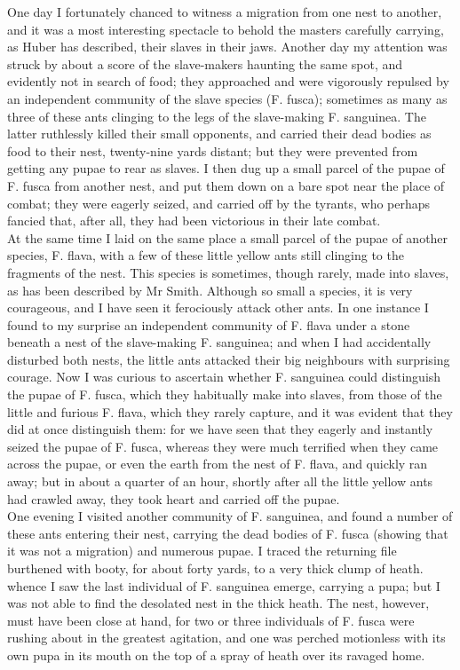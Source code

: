 \indent One day I fortunately chanced to witness a migration from one nest to another, and it was a most interesting spectacle to behold the masters carefully carrying, as Huber has described, their slaves in their jaws. Another day my attention was struck by about a score of the slave-makers haunting the same spot, and evidently not in search of food; they approached and were vigorously repulsed by an independent community of the slave species (F. fusca); sometimes as many as three of these ants clinging to the legs of the slave-making F. sanguinea. The latter ruthlessly killed their small opponents, and carried their dead bodies as food to their nest, twenty-nine yards distant; but they were prevented from getting any pupae to rear as slaves. I then dug up a small parcel of the pupae of F. fusca from another nest, and put them down on a bare spot near the place of combat; they were eagerly seized, and carried off by the tyrants, who perhaps fancied that, after all, they had been victorious in their late combat.\\
\indent At the same time I laid on the same place a small parcel of the pupae of another species, F. flava, with a few of these little yellow ants still clinging to the fragments of the nest. This species is sometimes, though rarely, made into slaves, as has been described by Mr Smith. Although so small a species, it is very courageous, and I have seen it ferociously attack other ants. In one instance I found to my surprise an independent community of F. flava under a stone beneath a nest of the slave-making F. sanguinea; and when I had accidentally disturbed both nests, the little ants attacked their big neighbours with surprising courage. Now I was curious to ascertain whether F. sanguinea could distinguish the pupae of F. fusca, which they habitually make into slaves, from those of the little and furious F. flava, which they rarely capture, and it was evident that they did at once distinguish them: for we have seen that they eagerly and instantly seized the pupae of F. fusca, whereas they were much terrified when they came across the pupae, or even the earth from the nest of F. flava, and quickly ran away; but in about a quarter of an hour, shortly after all the little yellow ants had crawled away, they took heart and carried off the pupae.\\
\indent One evening I visited another community of F. sanguinea, and found a number of these ants entering their nest, carrying the dead bodies of F. fusca (showing that it was not a migration) and numerous pupae.  I traced the returning file burthened with booty, for about forty yards, to a very thick clump of heath. whence I saw the last individual of F. sanguinea emerge, carrying a pupa; but I was not able to find the desolated nest in the thick heath. The nest, however, must have been close at hand, for two or three individuals of F. fusca were rushing about in the greatest agitation, and one was perched motionless with its own pupa in its mouth on the top of a spray of heath over its ravaged home.\\
